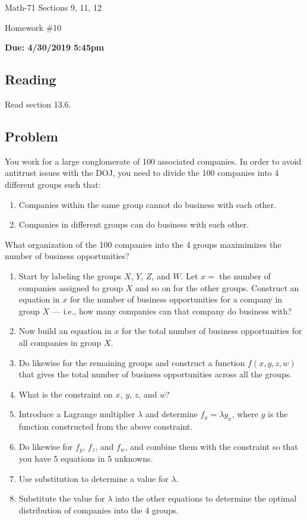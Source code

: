 \documentclass[letterpaper,12pt,fleqn]{article}
\renewcommand{\l}{\lambda}
\begin{document}
\begin{center}
  \large
  Math-71 Sections 9, 11, 12

  \Large
  Homework \#10

  \large
  \textbf{Due: 4/30/2019 5:45pm}
\end{center}

\subsection*{Reading}

Read section 13.6.

\subsection*{Problem}

You work for a large conglomerate of 100 associated companies.  In order to avoid antitrust issues with the DOJ, you need
to divide the 100 companies into 4 different groups such that:
\begin{enumerate}
\item Companies within the same group cannot do business with each other.
\item Companies in different groups can do business with each other.
\end{enumerate}
What organization of the 100 companies into the 4 groups maximimizes the number of business opportunities?

\begin{enumerate}[label={\alph*)}]
\item Start by labeling the groups \(X\), \(Y\), \(Z\), and \(W\).  Let \(x=\) the number of companies assigned to group \(X\)
  and so on for the other groups.  Construct an equation in \(x\) for the number of business opportunities for a company in
  group \(X\) --- i.e., how many companies can that company do business with?
\item Now build an equation in \(x\) for the total number of business opportunities for all companies in group \(X\).
\item Do likewise for the remaining groups and construct a function \(f(x,y,z,w)\) that gives the total number of business
  opportunities across all the groups.
\item What is the constraint on \(x\), \(y\), \(z\), and \(w\)?
\item Introduce a Lagrange multiplier \(\l\) and determine \(f_x=\l g_x\), where \(g\) is the function constructed from the
  above constraint.
\item Do likewise for \(f_y\), \(f_z\), and \(f_w\), and combine them with the constraint so that you have 5 equations in
  5 unknowns.
\item Use substitution to determine a value for \(\l\).
\item Substitute the value for \(\l\) into the other equations to determine the optimal distribution of companies into the
  4 groups.
\end{enumerate}
\end{document}
